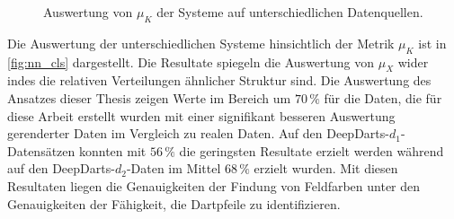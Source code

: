 \begin{figure}
    \centering
    \caption{Auswertung von $\mu_K$ der Systeme auf unterschiedlichen Datenquellen.}
    \label{fig:nn_cls}
\end{figure}

Die Auswertung der unterschiedlichen Systeme hinsichtlich der Metrik $\mu_K$ ist in \autoref{fig:nn_cls} dargestellt. Die Resultate spiegeln die Auswertung von $\mu_X$ wider indes die relativen Verteilungen ähnlicher Struktur sind. Die Auswertung des Ansatzes dieser Thesis zeigen Werte im Bereich um $70\,\%$ für die Daten, die für diese Arbeit erstellt wurden mit einer signifikant besseren Auswertung gerenderter Daten im Vergleich zu realen Daten. Auf den DeepDarts-$d_1$-Datensätzen konnten mit $56\,\%$ die geringsten Resultate erzielt werden während auf den DeepDarts-$d_2$-Daten im Mittel $68\,\%$ erzielt wurden. Mit diesen Resultaten liegen die Genauigkeiten der Findung von Feldfarben unter den Genauigkeiten der Fähigkeit, die Dartpfeile zu identifizieren.


